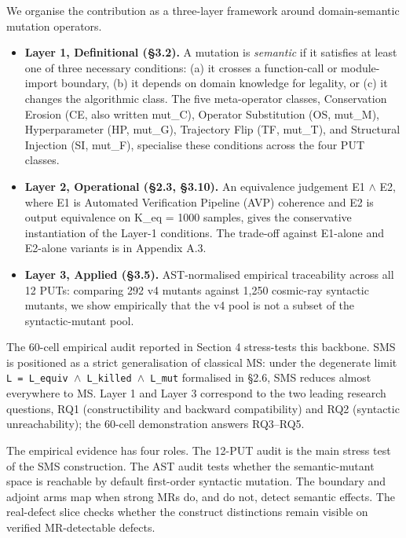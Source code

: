 \documentclass[manuscript,screen,review]{acmart}
\begin{document}
We organise the contribution as a three-layer framework around
domain-semantic mutation operators.

\begin{itemize}

\item
  \textbf{Layer 1, Definitional (§3.2).} A mutation is \emph{semantic}
  if it satisfies at least one of three necessary conditions: (a) it
  crosses a function-call or module-import boundary, (b) it depends on
  domain knowledge for legality, or (c) it changes the algorithmic
  class. The five meta-operator classes, Conservation Erosion (CE, also
  written mut\_C), Operator Substitution (OS, mut\_M), Hyperparameter
  (HP, mut\_G), Trajectory Flip (TF, mut\_T), and Structural Injection
  (SI, mut\_F), specialise these conditions across the four PUT classes.
\item
  \textbf{Layer 2, Operational (§2.3, §3.10).} An equivalence judgement
  E1 $\wedge$ E2, where E1 is Automated Verification Pipeline (AVP) coherence
  and E2 is output equivalence on K\_eq = 1000 samples, gives the
  conservative instantiation of the Layer-1 conditions. The trade-off
  against E1-alone and E2-alone variants is in Appendix A.3.
\item
  \textbf{Layer 3, Applied (§3.5).} AST-normalised empirical
  traceability across all 12 PUTs: comparing 292 v4 mutants against
  1,250 cosmic-ray syntactic mutants, we show empirically that the v4
  pool is not a subset of the syntactic-mutant pool.
\end{itemize}

The 60-cell empirical audit reported in Section 4 stress-tests this
backbone. SMS is positioned as a strict generalisation of classical MS:
under the
degenerate limit \texttt{L\ =\ L\_equiv\ $\wedge$\ L\_killed\ $\wedge$\ L\_mut}
formalised in §2.6, SMS reduces almost everywhere to MS. Layer 1 and
Layer 3 correspond to the two leading research questions, RQ1
(constructibility and backward compatibility) and RQ2 (syntactic
unreachability); the 60-cell demonstration answers RQ3--RQ5.

The empirical evidence has four roles. The 12-PUT audit is the main
stress test of the SMS construction. The AST audit tests whether the
semantic-mutant space is reachable by default first-order syntactic
mutation. The boundary and adjoint arms map when strong MRs do, and do
not, detect semantic effects. The real-defect slice checks whether the
construct distinctions remain visible on verified MR-detectable defects.
\end{document}
